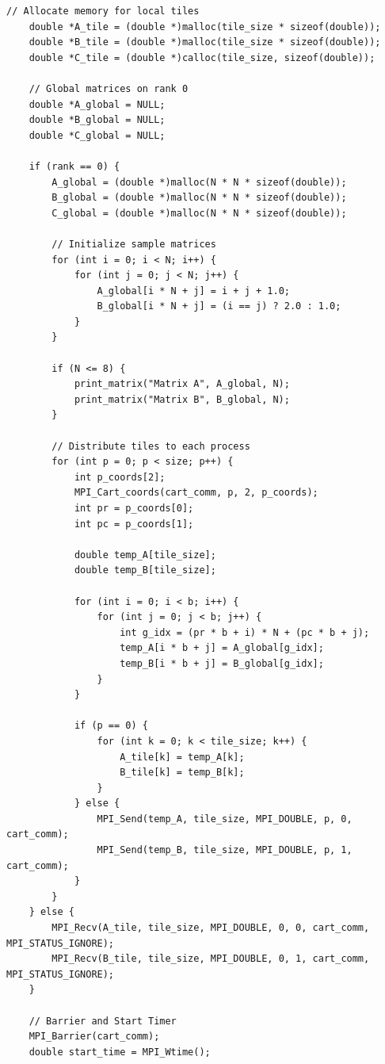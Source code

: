 \documentclass[12pt]{article}
\begin{document}
\begin{lstlisting}[style=code]
    // Allocate memory for local tiles
    double *A_tile = (double *)malloc(tile_size * sizeof(double));
    double *B_tile = (double *)malloc(tile_size * sizeof(double));
    double *C_tile = (double *)calloc(tile_size, sizeof(double));

    // Global matrices on rank 0
    double *A_global = NULL;
    double *B_global = NULL;
    double *C_global = NULL;

    if (rank == 0) {
        A_global = (double *)malloc(N * N * sizeof(double));
        B_global = (double *)malloc(N * N * sizeof(double));
        C_global = (double *)malloc(N * N * sizeof(double));

        // Initialize sample matrices
        for (int i = 0; i < N; i++) {
            for (int j = 0; j < N; j++) {
                A_global[i * N + j] = i + j + 1.0;
                B_global[i * N + j] = (i == j) ? 2.0 : 1.0;
            }
        }

        if (N <= 8) {
            print_matrix("Matrix A", A_global, N);
            print_matrix("Matrix B", B_global, N);
        }

        // Distribute tiles to each process
        for (int p = 0; p < size; p++) {
            int p_coords[2];
            MPI_Cart_coords(cart_comm, p, 2, p_coords);
            int pr = p_coords[0];
            int pc = p_coords[1];

            double temp_A[tile_size];
            double temp_B[tile_size];

            for (int i = 0; i < b; i++) {
                for (int j = 0; j < b; j++) {
                    int g_idx = (pr * b + i) * N + (pc * b + j);
                    temp_A[i * b + j] = A_global[g_idx];
                    temp_B[i * b + j] = B_global[g_idx];
                }
            }

            if (p == 0) {
                for (int k = 0; k < tile_size; k++) {
                    A_tile[k] = temp_A[k];
                    B_tile[k] = temp_B[k];
                }
            } else {
                MPI_Send(temp_A, tile_size, MPI_DOUBLE, p, 0, cart_comm);
                MPI_Send(temp_B, tile_size, MPI_DOUBLE, p, 1, cart_comm);
            }
        }
    } else {
        MPI_Recv(A_tile, tile_size, MPI_DOUBLE, 0, 0, cart_comm, MPI_STATUS_IGNORE);
        MPI_Recv(B_tile, tile_size, MPI_DOUBLE, 0, 1, cart_comm, MPI_STATUS_IGNORE);
    }

    // Barrier and Start Timer
    MPI_Barrier(cart_comm);
    double start_time = MPI_Wtime();


\end{lstlisting}
\end{document}
